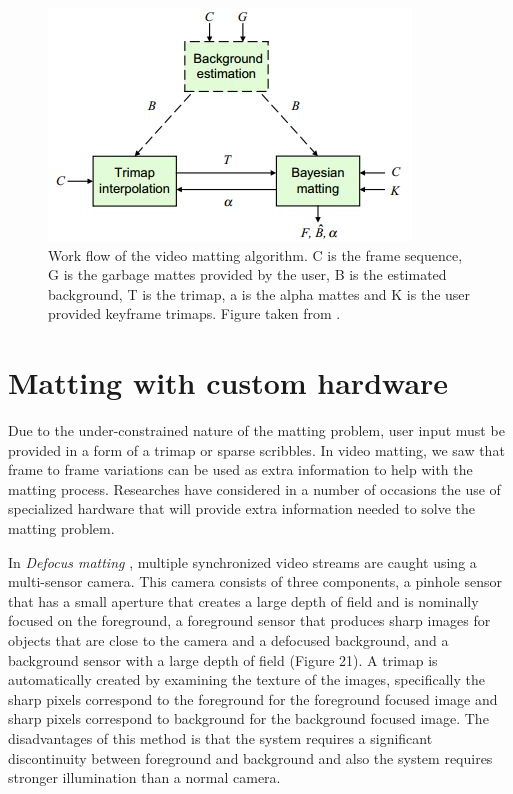 \begin{figure}[t!]
\centering
\includegraphics[width=0.8\columnwidth]{Chapter2/2/optical_figure_2.jpg}
\caption[Video matting work-flow.]{Work flow of the video matting algorithm. C is the frame sequence, G is the garbage mattes provided by the user, B is the estimated background, T is the trimap, a is the alpha mattes and K is the user provided keyframe trimaps. Figure taken from \cite{video}.}
\label{fig:optical-f2}
\end{figure}

\section{Matting with custom hardware}
\label{sec:matting-with-custom-hardware}

Due to the under-constrained nature of the matting problem, user input must be provided in a form of a trimap or sparse scribbles. In video matting, we saw that frame to frame variations can be used as extra information to help with the matting process. Researches have considered in a number of occasions the use of specialized hardware that will provide extra information needed to solve the matting problem.
\par
In \textit{Defocus matting} \cite{defocus}, multiple synchronized video streams are caught using a multi-sensor camera. This camera consists of three components, a pinhole sensor that has a small aperture that creates a large depth of field and is nominally focused on the foreground, a foreground sensor that produces sharp images for objects that are close to the camera and a defocused background, and a background sensor with a large depth of field (Figure 21). A trimap is automatically created by examining the texture of the images, specifically the sharp pixels correspond to the foreground for the foreground focused image and sharp pixels correspond to background for the background focused image. The disadvantages of this method is that the system requires a significant discontinuity between foreground and background and also the system requires stronger illumination than a normal camera.

